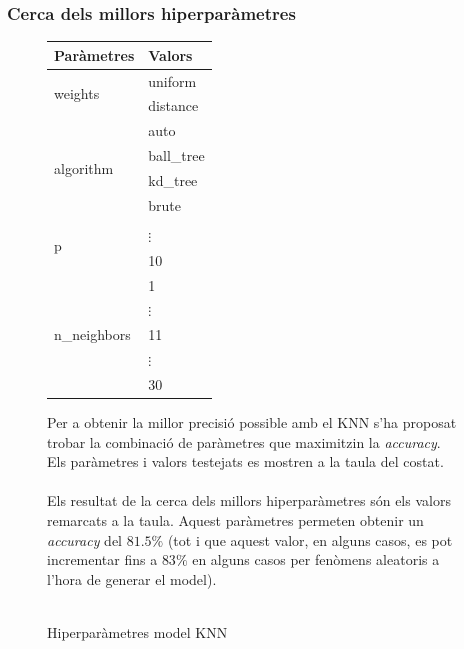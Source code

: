 \documentclass[a4paper, 11pt]{article}
\begin{document}
\subsubsection{Cerca dels millors hiperparàmetres}\label{millorsknn}
\begin{figure}[h] %
\begin{minipage}{8cm} %
\begin{center} %
    \begin{tabular}{l|l}
        \textbf{Paràmetres} & \textbf{Valors} \\\hline\hline
        \multirow{2}{*}{weights} & \cellcolor{lightapricot}uniform\\
        &distance\\\hline
        \multirow{4}{*}{algorithm} & \cellcolor{lightapricot}auto\\
        & ball\_tree \\ 
        & kd\_tree\\
        & brute\\ \hline
        \multirow{3}{*}{p} & \cellcolor{lightapricot}{1\\
        &$\vdots$\\
        & 10}\\ \hline
        \multirow{5}{*}{n\_neighbors} & 1\\
        & $\vdots$\\
        & \cellcolor{lightapricot}11\\
        & $\vdots$\\
        & 30 \\
    \end{tabular}
    \caption{Hiperparàmetres model KNN}
    \label{tab:afins}
\end{center}
\end{minipage} %
\hspace{2em}
\begin{minipage}{6.5cm} %
Per a obtenir la millor precisió possible amb el KNN s'ha proposat trobar la combinació de paràmetres que maximitzin la \textit{accuracy}.\\ Els paràmetres i valors testejats es mostren a la taula del costat.\\\\
Els resultat de la cerca dels millors hiperparàmetres són els valors remarcats a la taula. Aquest paràmetres permeten obtenir un \textit{accuracy} del $81.5\%$ (tot i que aquest valor, en alguns casos, es pot incrementar fins a $83\%$ en alguns casos per fenòmens aleatoris a l'hora de generar el model).\\\\ 

\end{minipage} %
\end{figure} %
\end{document}
